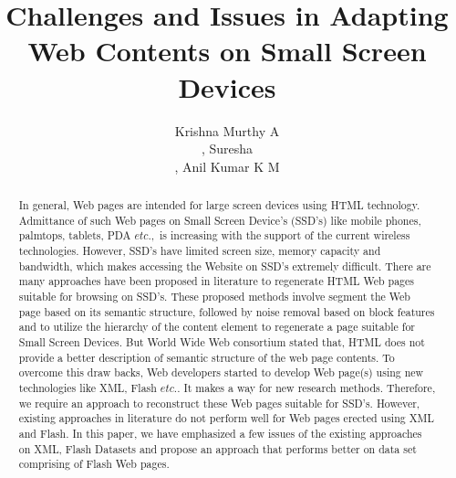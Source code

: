 \documentclass[fleqn,twoside]{article}
\title{\textbf{Challenges and Issues in Adapting Web Contents on Small Screen Devices}}
\author{Krishna Murthy A \address[DCSE]{Department of Computer Science, University of Mysore, Mysore, 570 006, India \\~Contact: krishnarjun.research@gmail.com \\},
Suresha \address[DCSE]{Department of Computer Science, University of Mysore, Mysore, 570 006, India\\~ Contact: sureshabm@yahoo.co.in\\},
Anil Kumar K M\address{Sri Jayachamarajendra College of Engineering, Mysore, India Contact: anilkmsjce@yahoo.co.in}}
\begin{document}
\begin{abstract}
In general, Web pages are intended for large screen devices using HTML technology. Admittance of such Web pages on Small Screen Device's (SSD's) like mobile phones, palmtops, tablets, PDA $etc.,$ is increasing with the support of the current wireless technologies. However, SSD's have limited screen size, memory capacity and bandwidth, which makes accessing the Website on SSD's extremely difficult. There are many approaches have been proposed in literature to regenerate HTML Web pages suitable for browsing on SSD's. These proposed methods involve segment the Web page based on its semantic structure, followed by noise removal based on block features and to utilize the hierarchy of the content element to regenerate a page suitable for Small Screen Devices. But World Wide Web consortium stated that, HTML does not provide a better description of semantic structure of the web page contents. To overcome this draw backs, Web developers started to develop Web page(s) using new technologies like XML, Flash $etc..$ It makes a way for new research methods. Therefore, we require an approach to reconstruct these Web pages suitable for SSD's.  However, existing approaches in literature do not perform well for Web pages erected using XML and Flash. In this paper, we have emphasized a few issues of the existing approaches on XML, Flash Datasets and propose an approach that performs better on data set comprising of Flash Web pages. 
\end{abstract}

\maketitle
\end{document}
